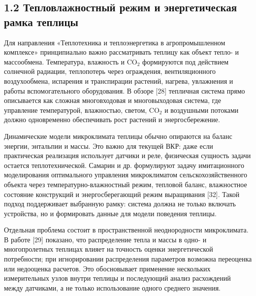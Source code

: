 \documentclass[a4paper,14pt]{extarticle}
\begin{document}
\hypertarget{ux442ux435ux43fux43bux43eux432ux43bux430ux436ux43dux43eux441ux442ux43dux44bux439-ux440ux435ux436ux438ux43c-ux438-ux44dux43dux435ux440ux433ux435ux442ux438ux447ux435ux441ux43aux430ux44f-ux440ux430ux43cux43aux430-ux442ux435ux43fux43bux438ux446ux44b}{%
\subsection{1.2 Тепловлажностный режим и энергетическая рамка
теплицы}\label{ux442ux435ux43fux43bux43eux432ux43bux430ux436ux43dux43eux441ux442ux43dux44bux439-ux440ux435ux436ux438ux43c-ux438-ux44dux43dux435ux440ux433ux435ux442ux438ux447ux435ux441ux43aux430ux44f-ux440ux430ux43cux43aux430-ux442ux435ux43fux43bux438ux446ux44b}}

Для направления «Теплотехника и теплоэнергетика в агропромышленном
комплексе» принципиально важно рассматривать теплицу как объект тепло- и
массообмена. Температура, влажность и CO\(_2\) формируются под действием
солнечной радиации, теплопотерь через ограждения, вентиляционного
воздухообмена, испарения и транспирации растений, нагрева, увлажнения и
работы вспомогательного оборудования. В обзоре {[}28{]} тепличная
система прямо описывается как сложная многовходовая и многовыходовая
система, где управление температурой, влажностью, светом, CO\(_2\) и
воздушными потоками должно одновременно обеспечивать рост растений и
энергосбережение.

Динамические модели микроклимата теплицы обычно опираются на баланс
энергии, энтальпии и массы. Это важно для текущей ВКР: даже если
практическая реализация использует датчики и реле, физическая сущность
задачи остается теплотехнической. Самарин и др. формулируют задачу
имитационного моделирования оптимального управления микроклиматом
сельскохозяйственного объекта через температурно-влажностный режим,
тепловой баланс, влажностное состояние конструкций и энергосберегающий
режим выращивания {[}32{]}. Такой подход поддерживает выбранную рамку:
система должна не только включать устройства, но и формировать данные
для модели поведения теплицы.

Отдельная проблема состоит в пространственной неоднородности
микроклимата. В работе {[}29{]} показано, что распределение тепла и
массы в одно- и многопролетных теплицах влияет на точность оценки
энергетической потребности; при игнорировании распределения параметров
возможна переоценка или недооценка расчетов. Это обосновывает применение
нескольких измерительных узлов внутри теплицы и последующий анализ
расхождений между датчиками, а не только использование одного среднего
значения.
\end{document}
